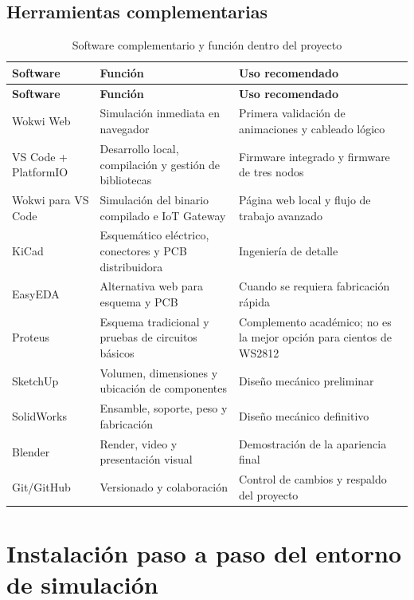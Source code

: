\documentclass[11pt,a4paper]{article}
\begin{document}
\subsection{Herramientas complementarias}
\begin{longtable}{@{}P{3.4cm}P{5.3cm}P{5.6cm}@{}}
\caption{Software complementario y función dentro del proyecto}\\
\toprule
\textbf{Software} & \textbf{Función} & \textbf{Uso recomendado}\\
\midrule
\endfirsthead
\toprule
\textbf{Software} & \textbf{Función} & \textbf{Uso recomendado}\\
\midrule
\endhead
Wokwi Web & Simulación inmediata en navegador & Primera validación de animaciones y cableado lógico\\
VS Code + PlatformIO & Desarrollo local, compilación y gestión de bibliotecas & Firmware integrado y firmware de tres nodos\\
Wokwi para VS Code & Simulación del binario compilado e IoT Gateway & Página web local y flujo de trabajo avanzado\\
KiCad & Esquemático eléctrico, conectores y PCB distribuidora & Ingeniería de detalle\\
EasyEDA & Alternativa web para esquema y PCB & Cuando se requiera fabricación rápida\\
Proteus & Esquema tradicional y pruebas de circuitos básicos & Complemento académico; no es la mejor opción para cientos de WS2812\\
SketchUp & Volumen, dimensiones y ubicación de componentes & Diseño mecánico preliminar\\
SolidWorks & Ensamble, soporte, peso y fabricación & Diseño mecánico definitivo\\
Blender & Render, video y presentación visual & Demostración de la apariencia final\\
Git/GitHub & Versionado y colaboración & Control de cambios y respaldo del proyecto\\
\bottomrule
\end{longtable}

\section{Instalación paso a paso del entorno de simulación}
\end{document}
